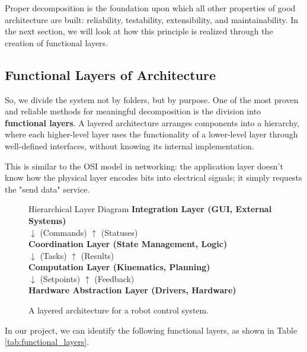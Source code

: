 Proper decomposition is the foundation upon which all other properties of good architecture are built: reliability, testability, extensibility, and maintainability. In the next section, we will look at how this principle is realized through the creation of functional layers.

\subsection{Functional Layers of Architecture}

So, we divide the system not by folders, but by purpose. One of the most proven and reliable methods for meaningful decomposition is the division into \textbf{functional layers}. A layered architecture arranges components into a hierarchy, where each higher-level layer uses the functionality of a lower-level layer through well-defined interfaces, without knowing its internal implementation.

This is similar to the OSI model in networking: the application layer doesn't know how the physical layer encodes bits into electrical signals; it simply requests the "send data" service.

\begin{figure}[h!]
    \centering
    \begin{infobox}{Hierarchical Layer Diagram}
        \textbf{Integration Layer (GUI, External Systems)}\\
        $\downarrow$ (Commands) \quad $\uparrow$ (Statuses) \\
        \textbf{Coordination Layer (State Management, Logic)}\\
        $\downarrow$ (Tasks) \quad $\uparrow$ (Results) \\
        \textbf{Computation Layer (Kinematics, Planning)}\\
        $\downarrow$ (Setpoints) \quad $\uparrow$ (Feedback) \\
        \textbf{Hardware Abstraction Layer (Drivers, Hardware)}\\
    \end{infobox}
    \caption{A layered architecture for a robot control system.}
    \label{fig:layered_architecture}
\end{figure}

In our project, we can identify the following functional layers, as shown in Table \ref{tab:functional_layers}.



